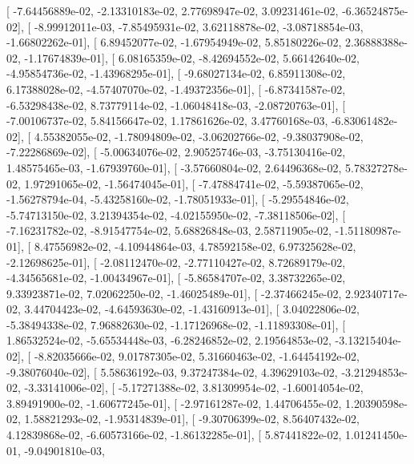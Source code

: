 \documentclass{article}
\begin{document}
       [ -7.64456889e-02,  -2.13310183e-02,   2.77698947e-02,
          3.09231461e-02,  -6.36524875e-02],
       [ -8.99912011e-03,  -7.85495931e-02,   3.62118878e-02,
         -3.08718854e-03,  -1.66802262e-01],
       [  6.89452077e-02,  -1.67954949e-02,   5.85180226e-02,
          2.36888388e-02,  -1.17674839e-01],
       [  6.08165359e-02,  -8.42694552e-02,   5.66142640e-02,
         -4.95854736e-02,  -1.43968295e-01],
       [ -9.68027134e-02,   6.85911308e-02,   6.17388028e-02,
         -4.57407070e-02,  -1.49372356e-01],
       [ -6.87341587e-02,  -6.53298438e-02,   8.73779114e-02,
         -1.06048418e-03,  -2.08720763e-01],
       [ -7.00106737e-02,   5.84156647e-02,   1.17861626e-02,
          3.47760168e-03,  -6.83061482e-02],
       [  4.55382055e-02,  -1.78094809e-02,  -3.06202766e-02,
         -9.38037908e-02,  -7.22286869e-02],
       [ -5.00634076e-02,   2.90525746e-03,  -3.75130416e-02,
          1.48575465e-03,  -1.67939760e-01],
       [ -3.57660804e-02,   2.64496368e-02,   5.78327278e-02,
          1.97291065e-02,  -1.56474045e-01],
       [ -7.47884741e-02,  -5.59387065e-02,  -1.56278794e-04,
         -5.43258160e-02,  -1.78051933e-01],
       [ -5.29554846e-02,  -5.74713150e-02,   3.21394354e-02,
         -4.02155950e-02,  -7.38118506e-02],
       [ -7.16231782e-02,  -8.91547754e-02,   5.68826848e-03,
          2.58711905e-02,  -1.51180987e-01],
       [  8.47556982e-02,  -4.10944864e-03,   4.78592158e-02,
          6.97325628e-02,  -2.12698625e-01],
       [ -2.08112470e-02,  -2.77110427e-02,   8.72689179e-02,
         -4.34565681e-02,  -1.00434967e-01],
       [ -5.86584707e-02,   3.38732265e-02,   9.33923871e-02,
          7.02062250e-02,  -1.46025489e-01],
       [ -2.37466245e-02,   2.92340717e-02,   3.44704423e-02,
         -4.64593630e-02,  -1.43160913e-01],
       [  3.04022806e-02,  -5.38494338e-02,   7.96882630e-02,
         -1.17126968e-02,  -1.11893308e-01],
       [  1.86532524e-02,  -5.65534448e-03,  -6.28246852e-02,
          2.19564853e-02,  -3.13215404e-02],
       [ -8.82035666e-02,   9.01787305e-02,   5.31660463e-02,
         -1.64454192e-02,  -9.38076040e-02],
       [  5.58636192e-03,   9.37247384e-02,   4.39629103e-02,
         -3.21294853e-02,  -3.33141006e-02],
       [ -5.17271388e-02,   3.81309954e-02,  -1.60014054e-02,
          3.89491900e-02,  -1.60677245e-01],
       [ -2.97161287e-02,   1.44706455e-02,   1.20390598e-02,
          1.58821293e-02,  -1.95314839e-01],
       [ -9.30706399e-02,   8.56407432e-02,   4.12839868e-02,
         -6.60573166e-02,  -1.86132285e-01],
       [  5.87441822e-02,   1.01241450e-01,  -9.04901810e-03,
\end{document}
